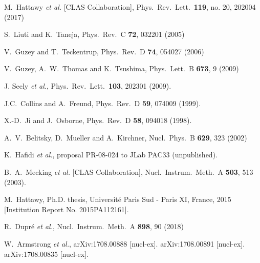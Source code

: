 \documentclass[twocolumn,nofootinbib,showpacs,prl,superscriptaddress,secnumarabic,amssymb,nobibnotes,aps,floatfix]{revtex4}
\begin{document}
\begin{thebibliography}{99}
   M.~Hattawy {\it et al.} [CLAS Collaboration],
   Phys.\ Rev.\ Lett.\  {\bf 119}, no. 20, 202004 (2017)


S.~Liuti and K.~Taneja, Phys.\ Rev.\ C {\bf 72}, 032201 (2005)

 V.~Guzey and T.~Teckentrup, Phys.\ Rev.\ D {\bf 74}, 
   054027 (2006)

 V.~Guzey, A.~W.~Thomas and K.~Tsushima,
  Phys.\ Lett.\ B {\bf 673}, 9 (2009)

J. Seely {\it et al.}, Phys.\ Rev.\ Lett.\ {\bf 103}, 202301 (2009).


J.C.~Collins and A.~Freund, Phys.\ Rev.\ D {\bf 59}, 074009 (1999).

   X.-D.~Ji and J.~Osborne, Phys.\ Rev.\ D {\bf 58}, 094018 (1998).

A.~V.~Belitsky, D.~Mueller and A.~Kirchner,
Nucl.\ Phys.\ B {\bf 629}, 323 (2002)


 K.~Hafidi {\it et al.},
   proposal PR-08-024 to JLab PAC33 (unpublished).

 B.~A.~Mecking {\it et al.} [CLAS Collaboration],
   Nucl.\ Instrum.\ Meth.\ A {\bf 503}, 513 (2003).

M.~Hattawy, Ph.D. thesis, Universit{\'e} Paris Sud - Paris XI, France, 2015 
[Institution Report No. 2015PA112161].

  R.~Dupr\'e {\it et al.},
  Nucl.\ Instrum.\ Meth.\ A {\bf 898}, 90 (2018)

 W.~Armstrong {\it et al.},
     arXiv:1708.00888 [nucl-ex].
       arXiv:1708.00891 [nucl-ex].
         arXiv:1708.00835 [nucl-ex].





\end{thebibliography}
\end{document}
